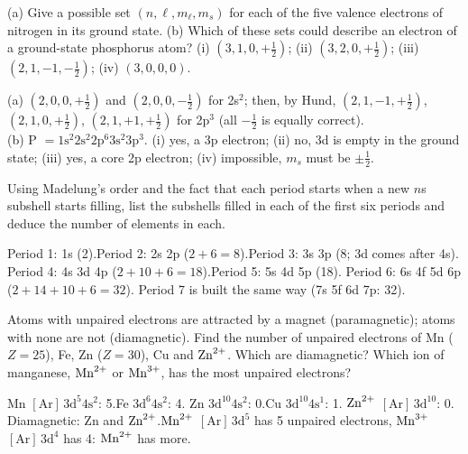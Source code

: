 (a) Give a possible set $(n,\ell,m_\ell,m_s)$ for each of the five valence electrons of nitrogen in
its ground state. (b) Which of these sets could describe an electron of a ground-state phosphorus atom?
(i) $(3,1,0,+\frac12)$; (ii) $(3,2,0,+\frac12)$; (iii) $(2,1,-1,-\frac12)$; (iv) $(3,0,0,0)$.
\begin{solution}
(a) $(2,0,0,+\frac12)$ and $(2,0,0,-\frac12)$ for 2s$^2$; then, by Hund, $(2,1,-1,+\frac12)$,
$(2,1,0,+\frac12)$, $(2,1,+1,+\frac12)$ for 2p$^3$ (all $-\frac12$ is equally correct).\\
(b) P $= 1\mathrm s^2 2\mathrm s^2 2\mathrm p^6 3\mathrm s^2 3\mathrm p^3$. (i) yes, a 3p electron;
(ii) no, 3d is empty in the ground state; (iii) yes, a core 2p electron; (iv) impossible,
$m_s$ must be $\pm\frac12$.
\end{solution}

Using Madelung's order and the fact that each period starts when a new $n$s subshell starts filling,
list the subshells filled in each of the first six periods and deduce the number of elements in each.
\begin{solution}
Period 1: 1s (2).\quad Period 2: 2s 2p ($2+6 = 8$).\quad Period 3: 3s 3p (8; 3d comes after 4s).\quad
Period 4: 4s 3d 4p ($2+10+6 = 18$).\quad Period 5: 5s 4d 5p (18).\quad
Period 6: 6s 4f 5d 6p ($2+14+10+6 = 32$). Period 7 is built the same way (7s 5f 6d 7p: 32).
\end{solution}

Atoms with unpaired electrons are attracted by a magnet (paramagnetic); atoms with none are not
(diamagnetic). Find the number of unpaired electrons of Mn ($Z = 25$), Fe, Zn ($Z = 30$), Cu and
$\ce{Zn^2+}$. Which are diamagnetic? Which ion of manganese, $\ce{Mn^2+}$ or $\ce{Mn^3+}$, has the most
unpaired electrons?
\begin{solution}
Mn $[\mathrm{Ar}]\,3\mathrm d^5 4\mathrm s^2$: 5.\quad Fe $3\mathrm d^6 4\mathrm s^2$: 4.\quad
Zn $3\mathrm d^{10} 4\mathrm s^2$: 0.\quad Cu $3\mathrm d^{10} 4\mathrm s^1$: 1.\quad
$\ce{Zn^2+}$ $[\mathrm{Ar}]\,3\mathrm d^{10}$: 0.\\
Diamagnetic: Zn and $\ce{Zn^2+}$.\quad $\ce{Mn^2+}$ $[\mathrm{Ar}]\,3\mathrm d^5$ has 5 unpaired electrons,
$\ce{Mn^3+}$ $[\mathrm{Ar}]\,3\mathrm d^4$ has 4: $\ce{Mn^2+}$ has more.
\end{solution}

